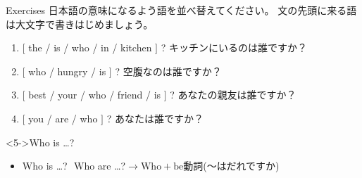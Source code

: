 \documentclass[aspectratio=169]{beamer}
\begin{document}
\begin{frame}[plain]{Exercises}
日本語の意味になるよう語を並べ替えてください。
文の先頭に来る語は大文字で書きはじめましょう。

 \begin{enumerate}
  \item  $[$ the / is / who / in / kitchen $]$ ? キッチンにいるのは誰ですか？\\
  \item  $[$ who / hungry / is $]$ ? 空腹なのは誰ですか？\\
  \item  $[$ best / your / who / friend / is $]$ ? あなたの親友は誰ですか？\\
  \item  $[$ you / are / who $]$ ? あなたは誰ですか？\\
\end{enumerate}

\begin{block}<5->{Who is \ldots{}?}
 \begin{itemize}
  \item Who is \ldots{}?\,\, Who are \ldots{}?\hfill{}$\longrightarrow\text{Who} + \text{be動詞}$(～はだれですか)\hfill{}

 \end{itemize}
\end{block}
\end{frame}
\end{document}
